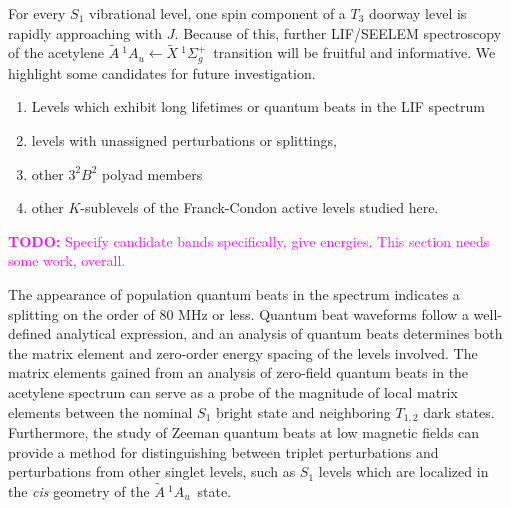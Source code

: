 \documentclass[12pt]{mitthesis}
\newcommand{\TODO} [1]{\textcolor{magenta}{\textbf{TODO:} #1}}
\newcommand{\astate}{$
  \tilde{A} \: ^1\!A_u
  $}
\newcommand{\AtoX}{$
  \tilde{A} \: ^1\!A_u 
  \leftarrow 
  \tilde{X} \: ^1\Sigma_g^+
  $}
\begin{document}
For every $S_1$ vibrational level, one spin component of a $T_3$
doorway level is rapidly approaching with $J$.  Because of this,
further LIF/SEELEM spectroscopy of the acetylene \AtoX\ transition
will be fruitful and informative.  We highlight some candidates for
future investigation.
\begin{enumerate}
\item Levels which exhibit long lifetimes or quantum beats in the LIF
  spectrum
\item levels with unassigned perturbations or splittings,
\item other $3^2B^2$ polyad members
\item other $K$-sublevels of the Franck-Condon active levels studied
  here.  
\end{enumerate}
\TODO{Specify candidate bands specifically, give energies.  This
  section needs some work, overall.}

The appearance of population quantum beats in the spectrum indicates a
splitting on the order of 80 MHz or less.  Quantum beat waveforms
follow a well-defined analytical expression, and an analysis of
quantum beats determines both the matrix element and zero-order energy
spacing of the levels involved.  The matrix elements gained from an
analysis of zero-field quantum beats in the acetylene spectrum can
serve as a probe of the magnitude of local matrix elements between the
nominal $S_1$ bright state and neighboring $T_{1,2}$ dark states.
Furthermore, the study of Zeeman quantum beats at low magnetic fields
can provide a method for distinguishing between triplet perturbations
and perturbations from other singlet levels, such as $S_1$ levels
which are localized in the \emph{cis} geometry of the \astate\ state.

 

\end{document}
